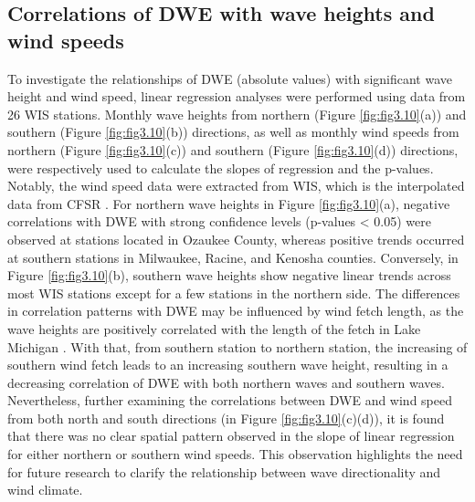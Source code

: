 \subsection{Correlations of DWE with wave heights and wind speeds}
\label{c3_Correlations of DWE with wave heights and wind speeds}
To investigate the relationships of DWE (absolute values) with significant wave height and wind speed, linear regression analyses were performed using data from 26 WIS stations. Monthly wave heights from northern (Figure \ref{fig:fig3.10}(a)) and southern (Figure \ref{fig:fig3.10}(b)) directions, as well as monthly wind speeds from northern (Figure \ref{fig:fig3.10}(c)) and southern (Figure \ref{fig:fig3.10}(d)) directions, were respectively used to calculate the slopes of regression and the p-values. Notably, the wind speed data were extracted from WIS, which is the interpolated data from CFSR \citep{saha_ncep_2010,saha_ncep_2014}. For northern wave heights in Figure \ref{fig:fig3.10}(a), negative correlations with DWE with strong confidence levels (p-values < 0.05) were observed at stations located in Ozaukee County, whereas positive trends occurred at southern stations in Milwaukee, Racine, and Kenosha counties. Conversely, in Figure \ref{fig:fig3.10}(b), southern wave heights show negative linear trends across most WIS stations except for a few stations in the northern side. The differences in correlation patterns with DWE may be influenced by wind fetch length, as the wave heights are positively correlated with the length of the fetch in Lake Michigan \citep{mason_effective_2018}. With that, from southern station to northern station, the increasing of southern wind fetch leads to an increasing southern wave height, resulting in a decreasing correlation of DWE with both northern waves and southern waves. Nevertheless, further examining the correlations between DWE and wind speed from both north and south directions (in Figure \ref{fig:fig3.10}(c)(d)), it is found that there was no clear spatial pattern observed in the slope of linear regression for either northern or southern wind speeds. This observation highlights the need for future research to clarify the relationship between wave directionality and wind climate.


